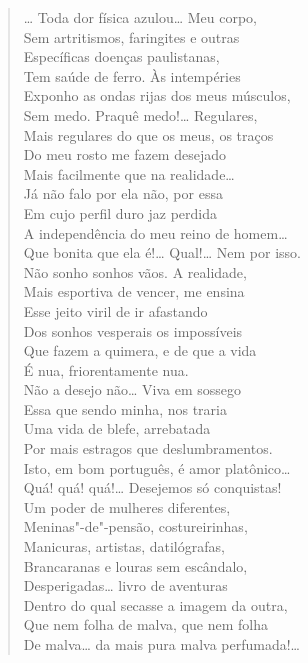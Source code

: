 \begin{verse}
\ldots{} Toda dor física azulou\ldots{} Meu corpo,\\
Sem artritismos, faringites e outras\\
Específicas doenças paulistanas,\\
Tem saúde de ferro. Às intempéries\\
Exponho as ondas rijas dos meus músculos,\\
Sem medo. Praquê medo!\ldots{} Regulares,\\
Mais regulares do que os meus, os traços\\
Do meu rosto me fazem desejado\\
Mais facilmente que na realidade\ldots{}\\
Já não falo por ela não, por essa\\
Em cujo perfil duro jaz perdida\\
A independência do meu reino de homem\ldots{}\\
Que bonita que ela é!\ldots{} Qual!\ldots{} Nem por isso.\\
Não sonho sonhos vãos. A realidade,\\
Mais esportiva de vencer, me ensina\\
Esse jeito viril de ir afastando\\
Dos sonhos vesperais os impossíveis\\
Que fazem a quimera, e de que a vida\\
É nua, friorentamente nua.\\
Não a desejo não\ldots{} Viva em sossego\\
Essa que sendo minha, nos traria\\
Uma vida de blefe, arrebatada\\
Por mais estragos que deslumbramentos.\\
Isto, em bom português, é amor platônico\ldots{}\\
Quá! quá! quá!\ldots{} Desejemos só conquistas!\\
Um poder de mulheres diferentes,\\
Meninas"-de"-pensão, costureirinhas,\\
Manicuras, artistas, datilógrafas,\\
Brancaranas e louras sem escândalo,\\
Desperigadas\ldots{} livro de aventuras\\
Dentro do qual secasse a imagem da outra,\\
Que nem folha de malva, que nem folha\\
De malva\ldots{} da mais pura malva perfumada!\ldots{}


\end{verse}
